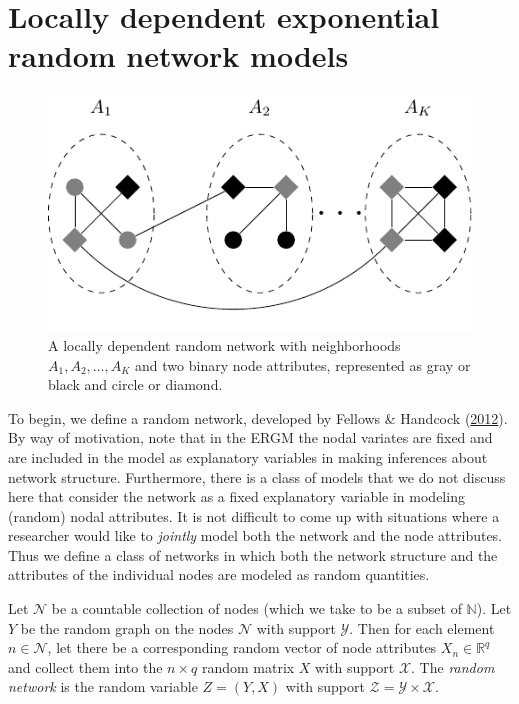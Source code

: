 \documentclass[12pt,twoside]{reedthesis}
\theoremstyle{definition}
\theoremstyle{definition}
\theoremstyle{remark}
\let\BeginKnitrBlock\begin \let\EndKnitrBlock\end
\begin{document}
\chapter{Locally dependent exponential random network
models}\label{locally-dependent-exponential-random-network-models}
\begin{figure}

{\centering \includegraphics{figure/ld_net} 

}

\caption{A locally dependent random network with neighborhoods \(A_1, A_2, \dots, A_K\) and two binary node attributes, represented as gray or black and circle or diamond.}\label{fig:rn-example}
\end{figure}
To begin, we define a random network, developed by Fellows \& Handcock
(\protect\hyperlink{ref-Fellows2012}{2012}). By way of motivation, note
that in the ERGM the nodal variates are fixed and are included in the
model as explanatory variables in making inferences about network
structure. Furthermore, there is a class of models that we do not
discuss here that consider the network as a fixed explanatory variable
in modeling (random) nodal attributes. It is not difficult to come up
with situations where a researcher would like to \emph{jointly} model
both the network and the node attributes. Thus we define a class of
networks in which both the network structure and the attributes of the
individual nodes are modeled as random quantities.

\BeginKnitrBlock{definition}[Random network]
\protect\hypertarget{def:RN}{}{\label{def:RN} {} }Let \(\mathcal{N}\) be a countable collection of nodes (which we
take to be a subset of \(\mathbb{N}\)). Let \(Y\) be the random graph on
the nodes \(\mathcal{N}\) with support \(\mathcal{Y}\). Then for each
element \(n \in \mathcal{N}\), let there be a corresponding random
vector of node attributes \(X_n \in \mathbb{R}^q\) and collect them into
the \(n \times q\) random matrix \(X\) with support \(\mathcal{X}\). The
\emph{random network} is the random variable \(Z = (Y, X)\) with support
\(\mathcal{Z} = \mathcal{Y} \times \mathcal{X}\).
\EndKnitrBlock{definition}
\end{document}
